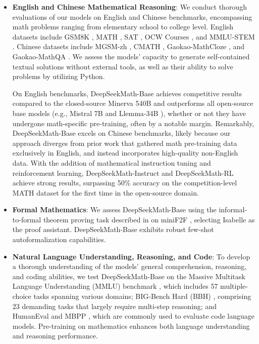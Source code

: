 \begin{itemize}[topsep=0pt]
    \item \textbf{English and Chinese Mathematical Reasoning}: We conduct thorough evaluations of our models on English and Chinese benchmarks, encompassing math problems ranging from elementary school to college level. English datasets include GSM8K \citep{gsm8k}, MATH \citep{MATH}, SAT \citep{llemma}, OCW Courses \citep{minerva}, and MMLU-STEM \citep{mmlu}. Chinese datasets include MGSM-zh \citep{mgsm}, CMATH \citep{wei2023cmath}, Gaokao-MathCloze \citep{agieval}, and Gaokao-MathQA \citep{agieval}. We assess the models’ capacity to generate self-contained textual solutions without external tools, as well as their ability to solve problems by utilizing Python.
    
    On English benchmarks, DeepSeekMath-Base achieves competitive results compared to the closed-source Minerva 540B \citep{minerva} and outperforms all open-source base models (e.g., Mistral 7B \citep{mistral} and Llemma-34B \citep{llemma}), whether or not they have undergone math-specific pre-training, often by a notable margin. Remarkably, DeepSeekMath-Base excels on Chinese benchmarks, likely because our approach diverges from prior work \citep{minerva,llemma} that gathered math pre-training data exclusively in English, and instead incorporates high-quality non-English data. With the addition of mathematical instruction tuning and reinforcement learning, DeepSeekMath-Instruct and DeepSeekMath-RL achieve strong results, surpassing 50\% accuracy on the competition-level MATH dataset for the first time in the open-source domain.
\end{itemize}

\begin{itemize}
    \item \textbf{Formal Mathematics}: We assess DeepSeekMath-Base using the informal-to-formal theorem proving task described in \citep{dsp_proof} on miniF2F \citep{minif2f}, selecting Isabelle \citep{isabelle} as the proof assistant. DeepSeekMath-Base exhibits robust few-shot autoformalization capabilities.
    \item \textbf{Natural Language Understanding, Reasoning, and Code}: To develop a thorough understanding of the models' general comprehension, reasoning, and coding abilities, we test DeepSeekMath-Base on the Massive Multitask Language Understanding (MMLU) benchmark \citep{mmlu}, which includes 57 multiple-choice tasks spanning various domains; BIG-Bench Hard (BBH) \citep{bbh}, comprising 23 demanding tasks that largely require multi-step reasoning; and HumanEval \citep{codex} and MBPP \citep{mbpp}, which are commonly used to evaluate code language models. Pre-training on mathematics enhances both language understanding and reasoning performance.
\end{itemize}

